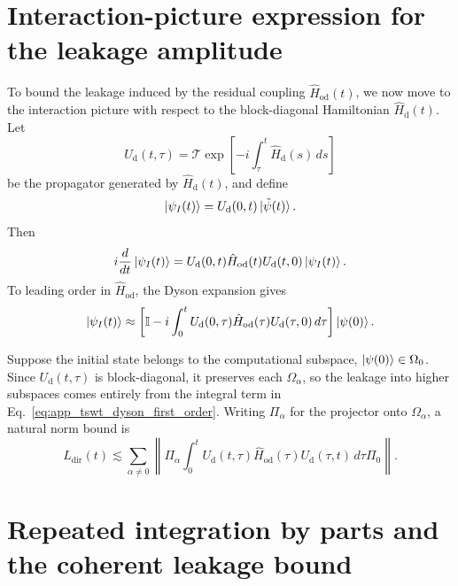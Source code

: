 \section{Interaction-picture expression for the leakage amplitude}
\label{app:tswt_interaction_picture_leakage}

To bound the leakage induced by the residual coupling \(\hat{H}_{\mathrm{od}}(t)\), we now move to the interaction picture with respect to the block-diagonal Hamiltonian \(\hat{H}_{\mathrm d}(t)\). Let
\begin{equation}
U_{\mathrm d}(t,\tau)
=
\mathcal{T}
\exp\!\left[
-i\int_{\tau}^{t}\hat{H}_{\mathrm d}(s)\,ds
\right]
\label{eq:app_tswt_Ud}
\end{equation}
be the propagator generated by \(\hat{H}_{\mathrm d}(t)\), and define
\begin{equation}
\ket{\psi_I(t)}
=
U_{\mathrm d}(0,t)\ket{\tilde{\psi}(t)}.
\label{eq:app_tswt_interaction_state}
\end{equation}
Then
\begin{equation}
i\frac{d}{dt}\ket{\psi_I(t)}
=
U_{\mathrm d}(0,t)\hat{H}_{\mathrm{od}}(t)U_{\mathrm d}(t,0)\ket{\psi_I(t)}.
\label{eq:app_tswt_interaction_schrodinger}
\end{equation}
To leading order in \(\hat{H}_{\mathrm{od}}\), the Dyson expansion gives
\begin{equation}
\ket{\psi_I(t)}
\approx
\left[
\mathbb{I}
-
i\int_{0}^{t}
U_{\mathrm d}(0,\tau)\hat{H}_{\mathrm{od}}(\tau)U_{\mathrm d}(\tau,0)\,d\tau
\right]
\ket{\psi(0)}.
\label{eq:app_tswt_dyson_first_order}
\end{equation}

Suppose the initial state belongs to the computational subspace, \(\ket{\psi(0)}\in\Omega_0\). Since \(U_{\mathrm d}(t,\tau)\) is block-diagonal, it preserves each \(\Omega_\alpha\), so the leakage into higher subspaces comes entirely from the integral term in Eq.~\eqref{eq:app_tswt_dyson_first_order}. Writing \(\Pi_\alpha\) for the projector onto \(\Omega_\alpha\), a natural norm bound is
\begin{equation}
L_{\mathrm{dir}}(t)
\lesssim
\sum_{\alpha\neq 0}
\left\|
\Pi_\alpha
\int_0^t
U_{\mathrm d}(t,\tau)\hat{H}_{\mathrm{od}}(\tau)U_{\mathrm d}(\tau,t)\,d\tau
\Pi_0
\right\|.
\label{eq:app_tswt_direct_leakage_start}
\end{equation}

\section{Repeated integration by parts and the coherent leakage bound}
\label{app:tswt_integration_by_parts}

